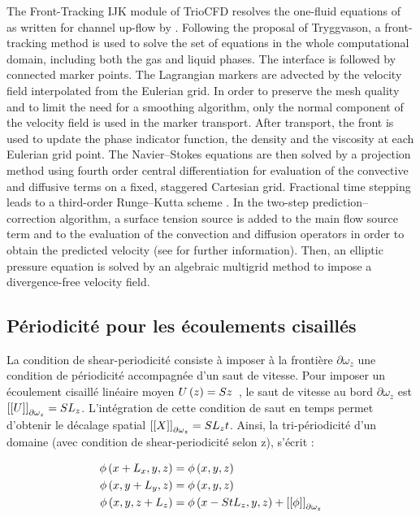 The Front-Tracking IJK module of TrioCFD resolves the one-fluid equations of ~\cite{kataoka1986} as written for channel up-flow by \cite{lu2008}. Following the proposal of Tryggvason, a front-tracking method is used to solve the set of equations in the whole computational domain, including both the gas and liquid phases. The interface is followed by connected marker points. The Lagrangian markers are advected by the velocity field interpolated from the Eulerian grid. In order to preserve the mesh quality and to limit the need for a smoothing algorithm, only the normal component of the velocity field is used in the marker transport. After transport, the front is used to update the phase indicator function, the density and the viscosity at each Eulerian grid point. The Navier–Stokes equations are then solved by a projection method \cite{puckett1997} using fourth order central differentiation for evaluation of the convective and diffusive terms on a fixed, staggered Cartesian grid. Fractional time stepping leads to a third-order Runge–Kutta scheme \cite{williamson1980}. In the two-step prediction–correction algorithm, a surface tension source is added to the main flow source term and to the evaluation of the convection and diffusion operators in order to obtain the predicted velocity (see \cite{mathieu2003} for further information). Then, an elliptic pressure equation is solved by an algebraic multigrid method to impose a divergence-free velocity field.

\subsection{Périodicité pour les écoulements cisaillés}

La condition de shear-periodicité consiste à imposer à la frontière $\partial\omega_z$ une condition de périodicité accompagnée d'un saut de vitesse. Pour imposer un écoulement cisaillé linéaire moyen $U\left( z\right)=Sz$~\cite{tanaka2015,tanaka2017,rosti2019}, le saut de vitesse au bord $\partial\omega_z$ est $\left[ \left[ U\right]\right]_{\partial\omega_z}=SL_z$. L'intégration de cette condition de saut en temps permet d'obtenir le décalage spatial $\left[ \left[ X\right]\right]_{\partial\omega_z}=SL_zt$. Ainsi, la tri-périodicité d'un domaine (avec condition de shear-periodicité selon z), s'écrit :

\begin{align}
\phi\left( x+L_x,y,z\right)&=\phi\left( x,y,z\right)\\
\phi\left( x,y+L_y,z\right)&=\phi\left( x,y,z\right)\\
\phi\left( x,y,z+L_z\right)&=\phi\left( x-StL_z,y,z\right)+\left[ \left[ \phi\right]\right]_{\partial\omega_z}\label{shear_perio}
\end{align}

